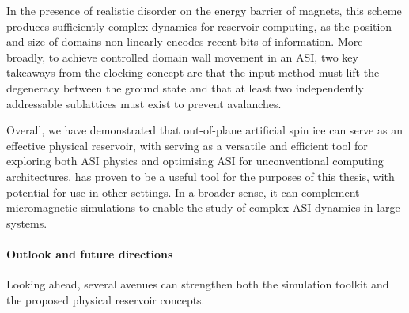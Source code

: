 In the presence of realistic disorder on the energy barrier of magnets, this scheme produces sufficiently complex dynamics for reservoir computing, as the position and size of domains non-linearly encodes recent bits of information.
More broadly, to achieve controlled domain wall movement in an ASI, two key takeaways from the clocking concept are that the input method must lift the degeneracy between the ground state and that at least two independently addressable sublattices must exist to prevent avalanches.  \\\par

Overall, we have demonstrated that out-of-plane artificial spin ice can serve as an effective physical reservoir, with \hotspice serving as a versatile and efficient tool for exploring both ASI physics and optimising ASI for unconventional computing architectures.
\hotspice has proven to be a useful tool for the purposes of this thesis, with potential for use in other settings.
In a broader sense, it can complement micromagnetic simulations to enable the study of complex ASI dynamics in large systems. %

\newpage
\paragraph{Outlook and future directions}
Looking ahead, several avenues can strengthen both the simulation toolkit and the proposed physical reservoir concepts.

